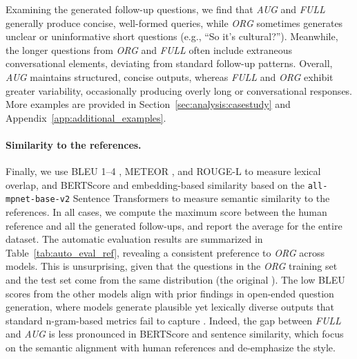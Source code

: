 Examining the generated follow-up questions, we find that \textit{AUG} and \textit{FULL} generally produce concise, well-formed queries, while \textit{ORG} sometimes generates unclear or uninformative short questions (e.g., ``So it's cultural?''). Meanwhile, the longer questions from \textit{ORG} and \textit{FULL} often include extraneous conversational elements, deviating from standard follow-up patterns. Overall, \textit{AUG} maintains structured, concise outputs, whereas \textit{FULL} and \textit{ORG} exhibit greater variability, occasionally producing overly long or conversational responses. More examples are provided in Section~\ref{sec:analysis:casestudy} and Appendix~\ref{app:additional_examples}.



\paragraph{Similarity to the references.} Finally, we use BLEU 1--4 \citep{papineni-etal-2002-bleu}, METEOR \citep{lavie-agarwal-2007-meteor}, and ROUGE-L \citep{lin-2004-rouge} to measure lexical overlap, and BERTScore \citep{bert-score} and embedding-based similarity based on the \texttt{all-mpnet-base-v2} Sentence Transformers \cite{reimers-gurevych-2019-sentence} to measure semantic similarity to the references. %
In all cases, we compute the maximum score between the human reference and all the generated follow-ups, and report the average for the entire dataset.  
The automatic evaluation results are summarized in Table~\ref{tab:auto_eval_ref}, revealing a consistent preference to \textit{ORG} across models. This is unsurprising, given that the questions in the \textit{ORG} training set and the test set come from the same distribution (the original \fd). %
The low BLEU scores from the other models align with prior findings in open-ended question generation, where models generate plausible yet lexically diverse outputs that standard n-gram-based metrics fail to capture \citep{pan-etal-2021-zero}. Indeed, the gap between \textit{FULL} and \textit{AUG} is less pronounced in BERTScore and sentence similarity, which focus on the semantic alignment with human references and de-emphasize the style.  

